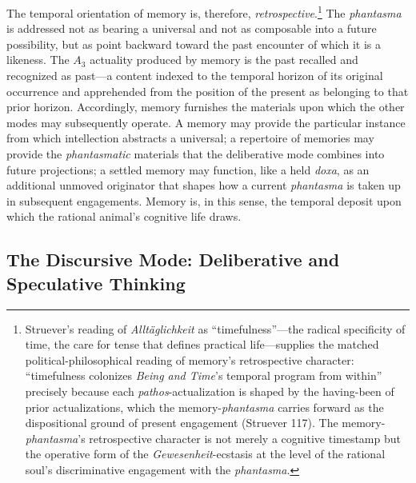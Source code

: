 \documentclass{article}
\begin{document}
The temporal orientation of memory is, therefore, \textit{retrospective}.\footnote{Struever's reading of \textit{Alltäglichkeit} as ``timefulness''---the radical specificity of time, the care for tense that defines practical life---supplies the matched political-philosophical reading of memory's retrospective character: ``timefulness colonizes \textit{Being and Time}'s temporal program from within'' precisely because each \textit{pathos}-actualization is shaped by the having-been of prior actualizations, which the memory-\textit{phantasma} carries forward as the dispositional ground of present engagement (Struever 117). The memory-\textit{phantasma}'s retrospective character is not merely a cognitive timestamp but the operative form of the \textit{Gewesenheit}-ecstasis at the level of the rational soul's discriminative engagement with the \textit{phantasma}.} The \textit{phantasma} is addressed not as bearing a universal and not as composable into a future possibility, but as point backward toward the past encounter of which it is a likeness. The $A_3$ actuality produced by memory is the past recalled and recognized as past---a content indexed to the temporal horizon of its original occurrence and apprehended from the position of the present as belonging to that prior horizon. Accordingly, memory furnishes the materials upon which the other modes may subsequently operate. A memory may provide the particular instance from which intellection abstracts a universal; a repertoire of memories may provide the \textit{phantasmatic} materials that the deliberative mode combines into future projections; a settled memory may function, like a held \textit{doxa}, as an additional unmoved originator that shapes how a current \textit{phantasma} is taken up in subsequent engagements. Memory is, in this sense, the temporal deposit upon which the rational animal's cognitive life draws. 

\subsection{The Discursive Mode: Deliberative and Speculative Thinking}
\end{document}
